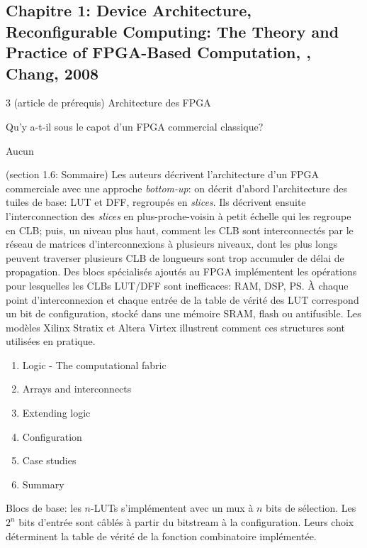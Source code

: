 
\subsection{Chapitre 1: Device Architecture, Reconfigurable Computing: The Theory and Practice of FPGA-Based Computation, \cite{chang_device_2008}, Chang, 2008}
 3 (article de prérequis)
 Architecture des FPGA

 Qu'y a-t-il sous le capot d'un FPGA commercial classique?

 Aucun

 (section 1.6: Sommaire) Les auteurs décrivent l'architecture d'un FPGA commerciale avec une approche \emph{bottom-up}: on décrit d'abord l'architecture des tuiles de base: LUT et DFF, regroupés en \emph{slices}. Ils décrivent ensuite l'interconnection des \emph{slices} en plus-proche-voisin à petit échelle qui les regroupe en CLB; puis, un niveau plus haut, comment les CLB sont interconnectés par le réseau de matrices d'interconnexions à plusieurs niveaux, dont les plus longs peuvent traverser plusieurs CLB de longueurs sont trop accumuler de délai de propagation. Des blocs spécialisés ajoutés au FPGA implémentent les opérations pour lesquelles les CLBs LUT/DFF sont inefficaces: RAM, DSP, PS. À chaque point d'interconnexion et chaque entrée de la table de vérité des LUT correspond un bit de configuration, stocké dans une mémoire SRAM, flash ou antifusible. Les modèles Xilinx Stratix et Altera Virtex illustrent comment ces structures sont utilisées en pratique.


\begin{enumerate}
	\item{Logic - The computational fabric}
	\item{Arrays and interconnects}
	\item{Extending logic}
	\item{Configuration}
	\item{Case studies}
	\item{Summary}
\end{enumerate}


Blocs de base: les $n$-LUTs s'implémentent avec un mux à $n$ bits de sélection. Les $2^n$ bits d'entrée sont câblés à partir du bitstream à la configuration. Leurs choix déterminent la table de vérité de la fonction combinatoire implémentée.

